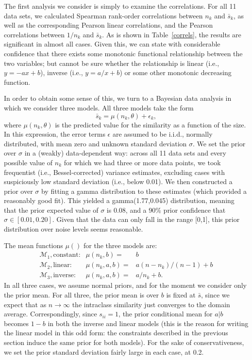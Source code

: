 \documentclass{apa}
\begin{document}
The first analysis we consider is simply to examine the correlations. For all 11 data sets, we calculated Spearman rank-order correlations between $n_k$ and $\bar{s}_k$, as well as the corresponding Pearson linear correlations, and the Pearson correlations between $1/n_k$ and $\bar{s}_k$. As is shown in Table~\ref{correls}, the results are significant in almost all cases.  Given this, we can state with considerable confidence that there exists some monotonic functional relationship between the two variables; but cannot be sure whether the relationship is linear (i.e., $y=-ax+b$), inverse (i.e., $y=a/x+b$) or some other monotonic decreasing function.



In order to obtain some sense of this, we turn to a Bayesian data analysis in which we consider three models. All three models take the form
\begin{equation}
\bar{s}_k = \mu(n_k,\theta) + \epsilon_k,
\end{equation}
\noindent
where $\mu(n_k,\theta)$ is the predicted value for the similarity as a function of the size. In this expression, the error terms $\epsilon$ are assumed to be i.i.d., normally distributed, with mean zero and unknown standard deviation $\sigma$. We set the prior over $\sigma$ in a (weakly) data-dependent way: across all 11 data sets and every possible value of $n_k$ for which we had three or more data points, we took frequentist (i.e., Bessel-corrected) variance estimates, excluding cases with suspiciously low standard deviation (i.e., below 0.01). We then constructed a prior over $\sigma$ by fitting a gamma distribution to these estimates (which provided a reasonably good fit). This yielded a gamma(1.77,0.045) distribution, meaning that the prior expected value of $\sigma$ is 0.08, and a 90\% prior confidence that $\sigma \in [0.01,0.20]$. Given that the data can only fall in the range [0,1], this prior distribution over noise levels seems reasonable.



The mean functions $\mu()$ for the three models are:
\begin{eqnarray}
\mathcal{M}_1, \mbox{constant:} &\mu(n_k,b) =& b \\
\mathcal{M}_2, \mbox{linear:} &\mu(n_k,a,b) =& a(n-n_k)/(n-1) + b \\
\mathcal{M}_3, \mbox{inverse:} &\mu(n_k,a,b) =& a/n_k + b.
\end{eqnarray}
\noindent
In all three cases, we assume normal priors, and for the moment we consider only the prior mean. For all three, the prior mean is over $b$ is fixed at $\bar{s}$, since we expect that as $n \rightarrow \infty$ the intraclass similarity just converges to the domain average. Correspondingly, since $s_{ii}=1$, the prior conditional mean for $a|b$ becomes $1-b$ in both the inverse and linear models (this is the reason for writing the linear model in this odd form: the constraints described in the previous section induce the same prior for both models). For the sake of conservativeness, we set the prior standard deviation fairly large in each case, at 0.2.
\end{document}
